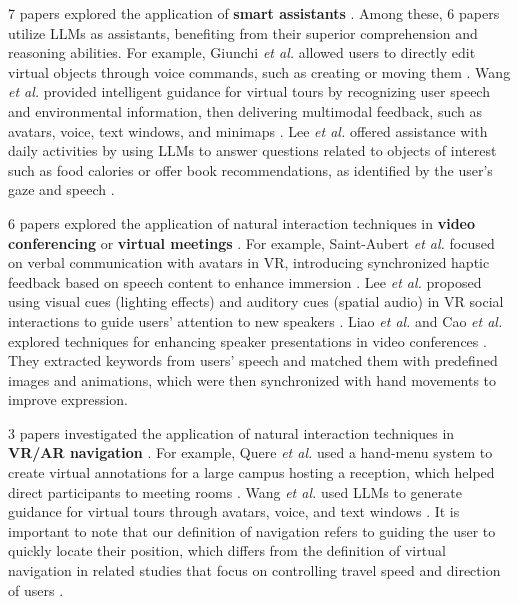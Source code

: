 \documentclass[review]{fcs}
\begin{document}
7 papers explored the application of \textbf{smart assistants} \cite{DBLP:conf/vr/GiunchiNGS24, DBLP:conf/chi/WangYWJ024, DBLP:conf/vr/YangQCSBLL24, DBLP:conf/chi/0005WBCRF24, 10.1145/3613904.3642068, DBLP:conf/chi/WuQQCRS24, DBLP:journals/imwut/WangSWYYWJXY24}. Among these, 6 papers utilize LLMs as assistants, benefiting from their superior comprehension and reasoning abilities. For example, Giunchi \textit{et al.} allowed users to directly edit virtual objects through voice commands, such as creating or moving them \cite{DBLP:conf/vr/GiunchiNGS24}. Wang \textit{et al.} provided intelligent guidance for virtual tours by recognizing user speech and environmental information, then delivering multimodal feedback, such as avatars, voice, text windows, and minimaps \cite{DBLP:conf/chi/WangYWJ024}. 
Lee \textit{et al.} offered assistance with daily activities by using LLMs to answer questions related to objects of interest such as food calories or offer book recommendations, as identified by the user’s gaze and speech \cite{DBLP:conf/chi/0005WBCRF24}.

6 papers explored the application of natural interaction techniques in \textbf{video conferencing} or \textbf{virtual meetings} \cite{DBLP:conf/vr/SaintAubertAMPAL23, 10462901, DBLP:conf/uist/LiaoKJKS22, DBLP:conf/chi/CaoKWAX24, 10049667, DBLP:conf/vr/WangZF24}.
For example, Saint-Aubert \textit{et al.} focused on verbal communication with avatars in VR, introducing synchronized haptic feedback based on speech content to enhance immersion \cite{DBLP:conf/vr/SaintAubertAMPAL23}. Lee \textit{et al.} proposed using visual cues (lighting effects) and auditory cues (spatial audio) in VR social interactions to guide users' attention to new speakers \cite{10462901}.
Liao \textit{et al.} and Cao \textit{et al.} explored techniques for enhancing speaker presentations in video conferences \cite{DBLP:conf/uist/LiaoKJKS22, DBLP:conf/chi/CaoKWAX24}. They extracted keywords from users' speech and matched them with predefined images and animations, which were then synchronized with hand movements to improve expression.


3 papers investigated the application of natural interaction techniques in \textbf{VR/AR navigation} \cite{DBLP:conf/vr/QuereMJWW24, DBLP:conf/chi/WangYWJ024, DBLP:conf/vr/YangQCSBLL24}. 
For example, Quere \textit{et al.} used a hand-menu system to create virtual annotations for a large campus hosting a reception, which helped direct participants to meeting rooms \cite{DBLP:conf/vr/QuereMJWW24}. Wang \textit{et al.} used LLMs to generate guidance for virtual tours through avatars, voice, and text windows \cite{DBLP:conf/chi/WangYWJ024}.
It is important to note that our definition of navigation refers to guiding the user to quickly locate their position, which differs from the definition of virtual navigation in related studies that focus on controlling travel speed and direction of users \cite{10.1145/3613904.3642147, DBLP:conf/vr/SinJLLLN24, DBLP:conf/vr/SindhupathirajaUDH24}.
\end{document}
